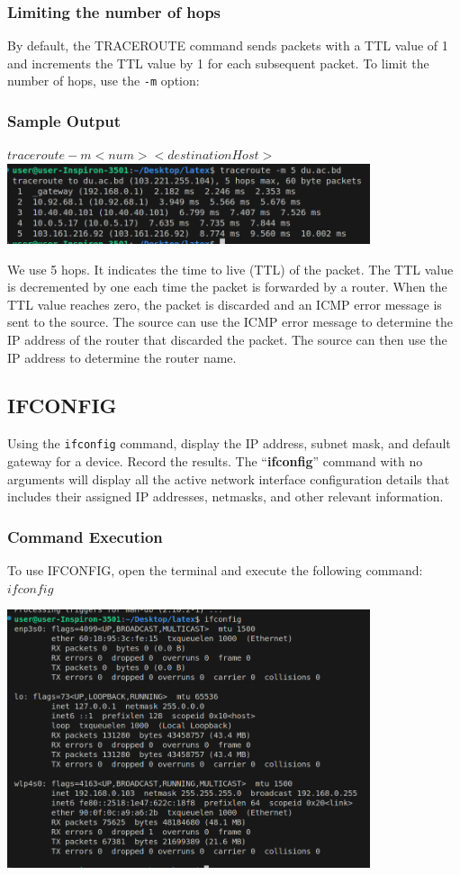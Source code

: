 \documentclass[12pt]{article}
\begin{document}
\subsubsection*{Limiting the number of hops}
By default, the TRACEROUTE command sends packets with a TTL value of 1 and increments the TTL value by 1 for each subsequent packet. To limit the number of hops, use the \texttt{-m} option:

\subsubsection*{Sample Output}
$
traceroute -m <num> <destinationHost>
$
\includegraphics[width=0.8\textwidth]{tracerouteCount.png}\par\vspace{1cm}
We use 5 hops. It indicates the time to live (TTL) of the packet. The TTL value is decremented by one each time the packet is forwarded by a router. When the TTL value reaches zero, the packet is discarded and an ICMP error message is sent to the source. The source can use the ICMP error message to determine the IP address of the router that discarded the packet. The source can then use the IP address to determine the router name.

\subsection{IFCONFIG}
Using the {
    \texttt{ifconfig}
} command, display the IP address, subnet mask, and default gateway for a device. Record the results. The “{\textbf{ifconfig}}” command with no arguments will display all the active network interface configuration details that includes their assigned IP addresses, netmasks, and other relevant information.

\subsubsection*{Command Execution}
To use IFCONFIG, open the terminal and execute the following command:
$ifconfig$

\includegraphics[width=0.8\textwidth]{ifconfig.png}\par\vspace{1cm}
\end{document}
